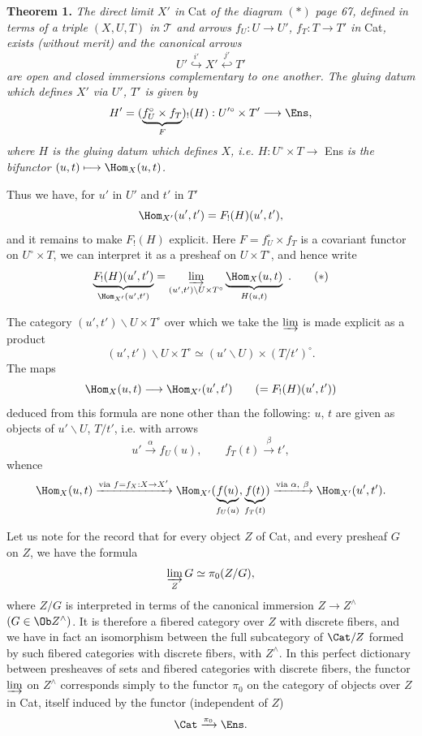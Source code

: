 \textbf{Theorem 1.} \textit{The direct limit $X'$ in} Cat \textit{of the diagram} $(*)$ \textit{page 67, defined in terms of a triple $(X,U,T)$ in $\mathcal{T}$ and arrows $f_U : U\longrightarrow U'$, $f_T : T\longrightarrow T'$ in} Cat\textit{, exists (without merit)}  \textit{and the canonical arrows}
\[
U' \overset{i'}{\hookrightarrow} X' \overset{j'}{\hookleftarrow} T'
\]
\textit{are open and closed immersions complementary to one another. The gluing datum which defines $X'$ via $U'$, $T'$ is given by}
\[
H' = (\underbrace{f_U^{\circ}\times f_T}_{F})_{!}(H) : U'^{\circ}\times T' \longrightarrow \Ens,
\]
\textit{where $H$ is the gluing datum which defines $X$, i.e. $H : U^{\circ}\times T\longrightarrow$} Ens \textit{is the bifunctor $(u,t)\longmapsto \Hom_X(u,t)$.}

Thus we have, for $u'$ in $U'$ and $t'$ in $T'$
\[
\Hom_{X'}(u',t') = F_{!}(H)(u',t'),
\]
and it remains to make $F_{!}(H)$ explicit. Here $F=f_U^{\circ}\times f_T$ is a covariant functor on $U^{\circ}\times T$, we can interpret it as a presheaf on $U\times T^{\circ}$, and hence write
\[
\underbrace{F_{!}(H)(u',t')}_{\Hom_{X'}(u',t')} = \varinjlim_{(u',t')\backslash U\times T^{\circ}} \underbrace{\Hom_X(u,t)}_{H(u,t)} \ .
\tag*{$(*)$}
\]

The category $(u',t')\backslash U\times T^{\circ}$ over which we take the $\varinjlim$ is made explicit as a product
\[
(u',t')\backslash U\times T^{\circ} \simeq (u'\backslash U)\times(T/t')^{\circ}.
\]
The maps
\[
\Hom_X(u,t)\longrightarrow \Hom_{X'}(u',t') \qquad (=F_{!}(H)(u',t'))
\]
 deduced from this formula are none other than the following: $u$, $t$ are given as objects of $u'\backslash U$, $T/t'$, i.e. with arrows
\[
u'\xrightarrow{\alpha} f_U(u), \qquad f_T(t)\xrightarrow{\beta} t',
\]
whence
\[
\Hom_X(u,t) \xrightarrow{\text{via } f=f_X:X\to X'} \Hom_{X'}(\underbrace{f(u)}_{f_U(u)},\underbrace{f(t)}_{f_T(t)}) \xrightarrow{\text{via } \alpha,\ \beta} \Hom_{X'}(u',t').
\]

Let us note for the record that for every object $Z$ of Cat, and every presheaf $G$ on $Z$, we have the formula
\[
\varinjlim_{Z} G \simeq \pi_0(Z/G),
\]
where $Z/G$ is interpreted in terms of the canonical immersion $Z\longrightarrow Z^{\wedge}$ $(G\in \Ob Z^{\wedge})$. It is therefore a fibered category over $Z$ with discrete fibers, and we have in fact an isomorphism between the full subcategory of $\Cat/Z$ formed by such fibered categories with discrete fibers, with $Z^{\wedge}$. In this perfect dictionary between presheaves of sets and fibered categories with discrete fibers, the functor $\varinjlim$ on $Z^{\wedge}$ corresponds simply to the functor $\pi_0$ on the category of objects over $Z$ in Cat, itself induced by the functor (independent of $Z$)
\[
\Cat \xrightarrow{\pi_0} \Ens.
\]

